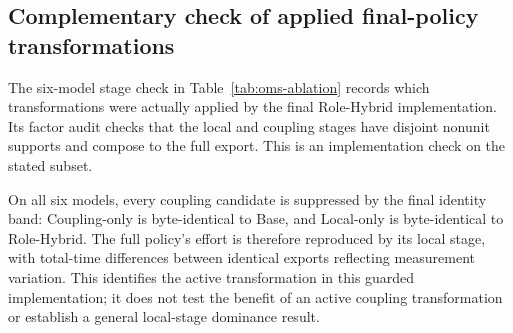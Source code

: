 \subsection{Complementary check of applied final-policy transformations}
\label{subsec:results-ablation}
The six-model stage check in Table~\ref{tab:oms-ablation} records which transformations
were actually applied by the final Role-Hybrid implementation. Its factor audit checks
that the local and coupling stages have disjoint nonunit supports and compose to the
full export. This is an implementation check on the stated subset.



On all six models, every coupling candidate is suppressed by the final identity band:
Coupling-only is byte-identical to Base, and Local-only is byte-identical to Role-Hybrid.
The full policy's effort is therefore reproduced by its local stage, with total-time
differences between identical exports reflecting measurement variation. This identifies
the active transformation in this guarded implementation; it does not test the benefit
of an active coupling transformation or establish a general local-stage dominance result.

